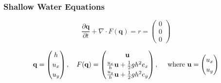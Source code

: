 \documentclass{beamer}
\newcommand{\pd}[2]{\dfrac{\partial #1}{\partial #2}}
\begin{document}
\begin{frame}
  \frametitle{Shallow Water Equations}
  \vspace{-.3cm}
  \begin{equation}
    \label{eq:shallow-water-basic}
    \pd{\mathbf{q}}{t} + \nabla \cdot F(\mathbf{q}) = r = \begin{pmatrix}
      0 \\ 0\\ 0
    \end{pmatrix}
  \end{equation}


  \begin{eqnarray*}
    \mathbf{q} =
    \begin{pmatrix}
      h \\ u_x \\ u_y
    \end{pmatrix}, \quad F(\mathbf{q}) =
    {
      \renewcommand{\arraystretch}{1.2}
      \begin{pmatrix}
        \mathbf{u} \\ \frac{u_x}{h} \mathbf{u} + \frac{1}{2} g h^2 e_x \\ \frac{u_y}{h} \mathbf{u}+
        \frac{1}{2} g h^2 e_y
      \end{pmatrix},\quad \text{ where } 
      \mathbf{u}=
      \begin{pmatrix}
        u_x \\ u_y
      \end{pmatrix}
    }
  \end{eqnarray*}
\end{frame}
\end{document}
